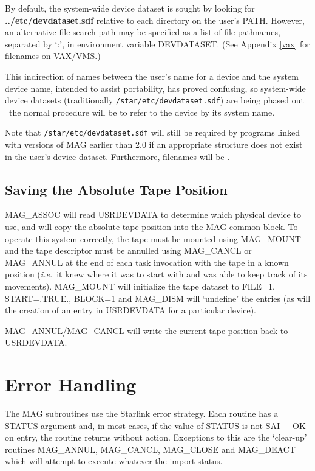 By default, the system-wide device dataset 
is sought by looking for {\bf ../etc/devdataset.sdf} relative to each 
directory on the user's PATH. However, an alternative file search path may be 
specified as a list of file pathnames, separated by `:', in environment 
variable DEVDATASET. (See Appendix \ref{vax} for filenames on VAX/VMS.)

This indirection of names between the user's name for a device and the
system device name, intended to assist portability, has proved confusing, 
so system-wide device datasets (traditionally {\tt /star/etc/devdataset.sdf}) 
are being phased out \dash\ the normal procedure will be to refer to the device
by its system name.

Note that {\tt /star/etc/devdataset.sdf} will still be required by programs 
linked with versions of MAG earlier than 2.0 if an appropriate structure does
not exist in the user's device dataset. Furthermore, filenames will be 
.

\subsection{Saving the Absolute Tape Position}
MAG\_ASSOC will read USRDEVDATA to determine which physical device to use, and 
will copy the absolute tape position into the MAG common block.
To operate this system correctly, the tape must be mounted using MAG\_MOUNT
and the tape descriptor must be annulled using MAG\_CANCL or MAG\_ANNUL at the 
end of each task invocation with the tape in a known position ({\em i.e.}\ it knew 
where it was to start with and was able to keep track of its movements).
MAG\_MOUNT will initialize the tape dataset to FILE=1, START=.TRUE., BLOCK=1
and MAG\_DISM will `undefine' the entries (as will the creation of an entry
in USRDEVDATA for a particular device).

MAG\_ANNUL/MAG\_CANCL will write the current tape position back to USRDEVDATA.

\section{Error Handling}

The MAG subroutines use the Starlink error strategy. Each routine has a STATUS
argument and, in most cases, if the value of STATUS is not SAI\_\_OK on entry, 
the routine returns without action. Exceptions to this are the `clear-up'
routines MAG\_ANNUL, MAG\_CANCL, MAG\_CLOSE and MAG\_DEACT which will attempt 
to execute whatever the import status.

